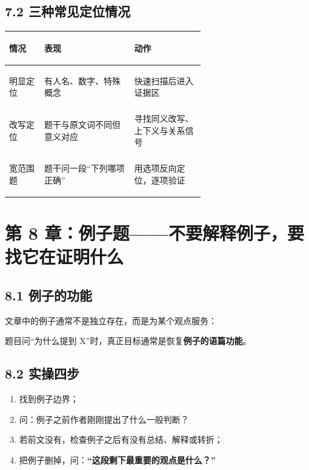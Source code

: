 \documentclass[11pt,a4paper]{ctexart}
\newcommand{\kw}[1]{\textbf{#1}}
\begin{document}
\subsection{7.2 三种常见定位情况}
\begin{center}
\small
\begin{tabularx}{\linewidth}{>{\bfseries\raggedright\arraybackslash}p{0.18\linewidth} >{\raggedright\arraybackslash}p{0.46\linewidth} Y}
\toprule
情况 & 表现 & 动作 \\
\midrule
明显定位 & 有人名、数字、特殊概念 & 快速扫描后进入证据区 \\
改写定位 & 题干与原文词不同但意义对应 & 寻找同义改写、上下义与关系信号 \\
宽范围题 & 题干问一段“下列哪项正确” & 用选项反向定位，逐项验证 \\
\bottomrule
\end{tabularx}
\end{center}

\section{第 8 章：例子题——不要解释例子，要找它在证明什么}

\subsection{8.1 例子的功能}
文章中的例子通常不是独立存在，而是为某个观点服务：
\begin{center}
\end{center}
题目问“为什么提到 X”时，真正目标通常是恢复\kw{例子的语篇功能}。

\subsection{8.2 实操四步}
\begin{enumerate}
  \item 找到例子边界；
  \item 问：例子之前作者刚刚提出了什么一般判断？
  \item 若前文没有，检查例子之后有没有总结、解释或转折；
  \item 把例子删掉，问：\kw{“这段剩下最重要的观点是什么？”}
\end{enumerate}
\end{document}
